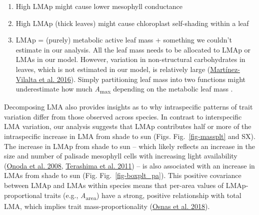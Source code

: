\documentclass[
  12pt,
  a4paper,
,tablecaptionabove
]{scrartcl}
\providecommand{\tightlist}{%
  \setlength{\itemsep}{0pt}\setlength{\parskip}{0pt}}
\begin{document}
\begin{enumerate}
\def\labelenumi{\arabic{enumi}.}
\tightlist
\item
  High LMAp might cause lower mesophyll conductance
\item
  High LMAp (thick leaves) might cause chloroplast self-shading within a
  leaf
\item
  LMAp = (purely) metabolic active leaf mass + something we couldn't
  estimate in our analysis. All the leaf mass needs to be allocated to
  LMAp or LMAs in our model. However, variation in non-structural
  carbohydrates in leaves, which is not estimated in our model, is
  relatively large
  (\protect\hyperlink{ref-Martinez-Vilalta2016}{Martínez-Vilalta et al.
  2016}). Simply partitioning leaf mass into two functions might
  underestimate how much \emph{A}\textsubscript{max} depending on the
  metabolic leaf mass .
\end{enumerate}

Decomposing LMA also provides insights as to why intraspecific patterns
of trait variation differ from those observed across species. In
contrast to interspecific LMA variation, our analysis suggests that LMAp
contributes half or more of the intraspecific increase in LMA from shade
to sun (Figs. Fig.~\ref{fig-massplt} and SX). The increase in LMAp from
shade to sun -- which likely reflects an increase in the size and number
of palisade mesophyll cells with increasing light availability
(\protect\hyperlink{ref-Onoda2008}{Onoda et al. 2008},
\protect\hyperlink{ref-Terashima2011}{Terashima et al. 2011}) -- is also
associated with an increase in LMAs from shade to sun (Fig.
Fig.~\ref{fig-boxplt_pa}). This positive covariance between LMAp and
LMAs within species means that per-area values of LMAp-proportional
traits (e.g., \emph{A}\textsubscript{area}) have a strong, positive
relationship with total LMA, which implies trait mass-proportionality
(\protect\hyperlink{ref-Osnas2018}{Osnas et al. 2018}).
\end{document}
